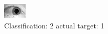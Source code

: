 \begin{figure}[h!]
\begin{center}
\includegraphics[width=0.60\columnwidth]{figures/ID1488_class_2_target_1.png}
\end{center}
\caption{ Classification: 2 actual target: 1}
\label{fig:ID1488_class_2_target_1}
\end{figure}
